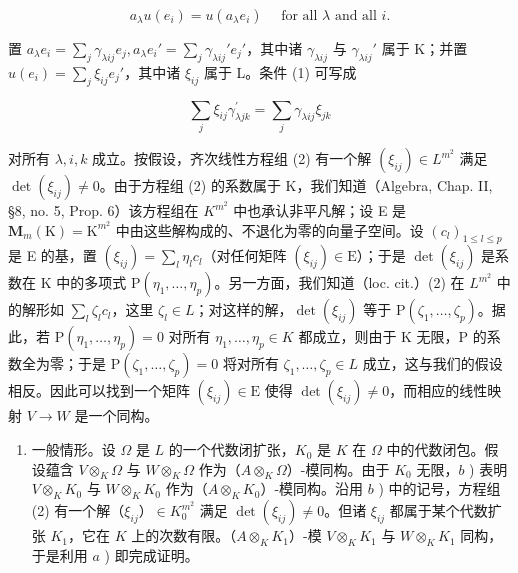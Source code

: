 \[
a _ {\lambda} u \left(e _ {i}\right) = u \left(a _ {\lambda} e _ {i}\right) \quad \text { for   all } \lambda \text { and   all } i.\tag{1}
\]

置 \(a_{\lambda}e_{i} = \sum_{j}\gamma_{\lambda ij}e_{j}, a_{\lambda}e_{i}' = \sum_{j}\gamma_{\lambda ij}'e_{j}'\)，其中诸 \(\gamma_{\lambda ij}\) 与 \(\gamma_{\lambda ij}'\) 属于 K；并置 \(u(e_i) = \sum_{j}\xi_{ij}e_j'\)，其中诸 \(\xi_{ij}\) 属于 L。条件 (1) 可写成

\[
\sum_ {j} \xi_ {i j} \gamma_ {\lambda j k} ^ {\prime} = \sum_ {j} \gamma_ {\lambda i j} \xi_ {j k}\tag{2}
\]

对所有 \(\lambda, i, k\) 成立。按假设，齐次线性方程组 (2) 有一个解 \((\xi_{ij}) \in L^{m^2}\) 满足 \(\det(\xi_{ij}) \neq 0\)。由于方程组 (2) 的系数属于 K，我们知道（Algebra, Chap. II, §8, no. 5, Prop. 6）该方程组在 \(K^{m^2}\) 中也承认非平凡解；设 E 是 \(\mathbf{M}_{m}(\mathrm{K})=\mathrm{K}^{m^{2}}\) 中由这些解构成的、不退化为零的向量子空间。设 \((c_{l})_{1\leqslant l\leqslant p}\) 是 E 的基，置 \((\xi_{ij})=\sum_{l}\eta_{l}c_{l}\)（对任何矩阵 \((\xi_{ij})\in\mathrm{E}\)）；于是 \(\det(\xi_{ij})\) 是系数在 K 中的多项式 \(\mathrm{P}(\eta_{1},\ldots,\eta_{p})\)。另一方面，我们知道（loc. cit.）(2) 在 \(L^{m^{2}}\) 中的解形如 \(\sum_{l}\zeta_{l}c_{l}\)，这里 \(\zeta_{l}\in L\)；对这样的解，\(\det(\xi_{ij})\) 等于 \(\mathrm{P}(\zeta_{1},\ldots,\zeta_{p})\)。据此，若 \(\mathrm{P}(\eta_{1},\ldots,\eta_{p})=0\) 对所有 \(\eta_{1},\ldots,\eta_{p}\in K\) 都成立，则由于 K 无限，P 的系数全为零；于是 \(\mathrm{P}(\zeta_{1},\ldots,\zeta_{p})=0\) 将对所有 \(\zeta_{1},\ldots,\zeta_{p}\in L\) 成立，这与我们的假设相反。因此可以找到一个矩阵 \((\xi_{ij})\in\mathrm{E}\) 使得 \(\det(\xi_{ij})\neq0\)，而相应的线性映射 \(V\to W\) 是一个同构。

\begin{enumerate}
\def\labelenumi{\alph{enumi})}
\setcounter{enumi}{2}
\tightlist
\item
  一般情形。设 \(\Omega\) 是 \(L\) 的一个代数闭扩张，\(K_0\) 是 \(K\) 在 \(\Omega\) 中的代数闭包。假设蕴含 \(V \otimes_K \Omega\) 与 \(W \otimes_K \Omega\) 作为（\(A \otimes_K \Omega\)）-模同构。由于 \(K_0\) 无限，\(b\) ) 表明 \(V \otimes_K K_0\) 与 \(W \otimes_K K_0\) 作为（\(A \otimes_K K_0\)）-模同构。沿用 \(b\) ) 中的记号，方程组 (2) 有一个解（\(\xi_{ij}\)）\(\in K_0^{m^2}\) 满足 \(\det(\xi_{ij}) \neq 0\)。但诸 \(\xi_{ij}\) 都属于某个代数扩张 \(K_1\)，它在 \(K\) 上的次数有限。（\(A \otimes_K K_1\)）-模 \(V \otimes_K K_1\) 与 \(W \otimes_K K_1\) 同构，于是利用 \(a\) ) 即完成证明。
\end{enumerate}

